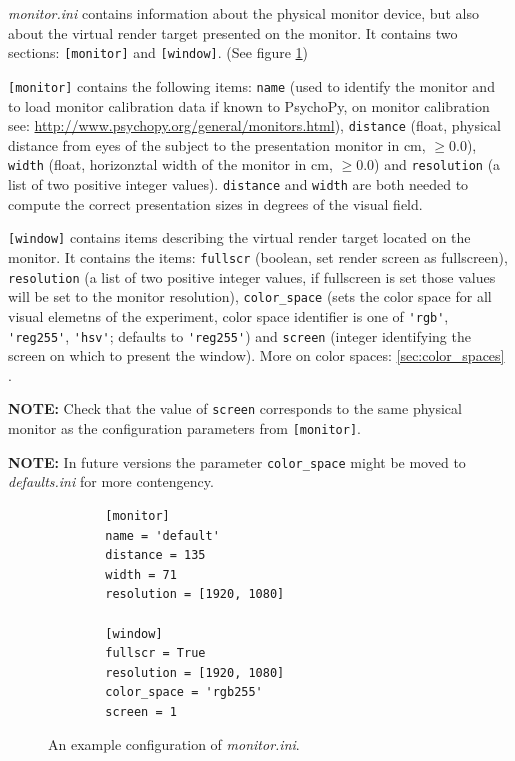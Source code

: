 \documentclass[12pt,a4paper]{book}
\begin{document}
\textit{monitor.ini} contains information about the physical monitor device, but also about the virtual render target presented on the monitor. It contains two sections: \verb|[monitor]| and \verb|[window]|. (See figure \ref{fig:monitorini})

\verb|[monitor]| contains the following items: \verb|name| (used to identify the monitor and to load monitor calibration data if known to PsychoPy, on monitor calibration see: \url{http://www.psychopy.org/general/monitors.html}), \verb|distance| (float, physical distance from eyes of the subject to the presentation monitor in cm, $\ge 0.0$), \verb|width| (float, horizonztal width of the monitor in cm, $\ge 0.0$) and \verb|resolution| (a list of two positive integer values). \verb|distance| and \verb|width| are both needed to compute the correct presentation sizes in degrees of the visual field.

\verb|[window]| contains items describing the virtual render target located on the monitor. It contains the items: \verb|fullscr| (boolean, set render screen as fullscreen), \verb|resolution| (a list of two positive integer values, if fullscreen is set those values will be set to the monitor resolution), \verb|color_space| (sets the color space for all visual elemetns of the experiment, color space identifier is one of \verb|'rgb'|, \verb|'reg255'|, \verb|'hsv'|; defaults to \verb|'reg255'|) and \verb|screen| (integer identifying the screen on which to present the window). More on color spaces: \ref{sec:color_spaces} .

\textbf{NOTE:} Check that the value of \verb|screen| corresponds to the same physical monitor as the configuration parameters from \verb|[monitor]|.

\textbf{NOTE:} In future versions the parameter \verb|color_space| might be moved to \textit{defaults.ini} for more contengency.

\begin{figure}
	\begin{framed}
		\begin{verbatim}
		[monitor]
		name = 'default'
		distance = 135
		width = 71
		resolution = [1920, 1080]
		
		[window]
		fullscr = True
		resolution = [1920, 1080]
		color_space = 'rgb255'
		screen = 1
		\end{verbatim}
	\end{framed}
	\caption{An example configuration of \textit{monitor.ini}.}
	\label{fig:monitorini}
\end{figure}
\end{document}
